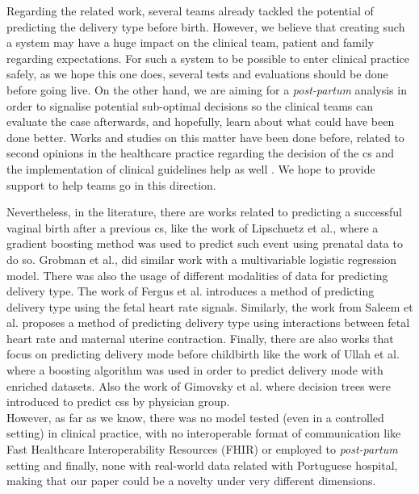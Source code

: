 Regarding the related work, several teams already tackled the potential of predicting the delivery type before birth. However, we believe that creating such a system may have a huge impact on the clinical team, patient and family regarding expectations. For such a system to be possible to enter clinical practice safely, as we hope this one does, several tests and evaluations should be done before going live.
On the other hand, we are aiming for a \textit{post-partum} analysis in order to signalise potential sub-optimal decisions so the clinical teams can evaluate the case afterwards, and hopefully, learn about what could have been done better.
Works and studies on this matter have been done before, related to second opinions in the healthcare practice regarding the decision of the \ac{cs} \cite{mandatorysecondopinion} and the implementation of clinical guidelines help as well \cite{reducingcaeresan}. We hope to provide support to help teams go in this direction.

Nevertheless, in the literature, there are works related to predicting a successful vaginal birth after a previous \ac{cs}, like the work of Lipschuetz et al., \cite{lipschuetzPredictionVaginalBirth2020} where a gradient boosting method was used to predict such event using prenatal data to do so. Grobman et al., \cite{grobman_development_2007} did similar work with a multivariable logistic regression model.
There was also the usage of different modalities of data for predicting delivery type. The work of Fergus et al. \cite{fergusClassificationCaesareanSection2017} introduces a method of predicting delivery type using the fetal heart rate signals. Similarly, the work from Saleem et al. \cite{saleemStrategyClassificationVaginal2019a} proposes a method of predicting delivery type using interactions between fetal heart rate and maternal uterine contraction.
Finally, there are also works that focus on predicting delivery mode before childbirth like the work of Ullah et al. \cite{ullah_reliable_2021} where a boosting algorithm was used in order to predict delivery mode with enriched datasets. Also the work of Gimovsky et al. \cite{gimovskyBenchmarkingCesareanDelivery} where decision trees were introduced  to predict \acp{cs} by physician group. \\
However, as far as we know, there was no model tested (even in a controlled setting) in clinical practice, with no interoperable format of communication like Fast Healthcare Interoperability Resources (FHIR) or employed to \textit{post-partum} setting and finally, none with real-world data related with Portuguese hospital, making that our paper could be a novelty under very different dimensions.



